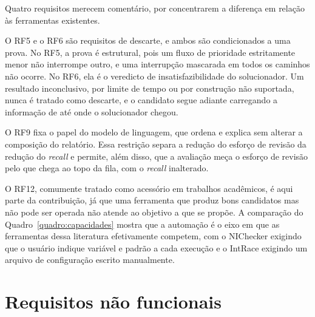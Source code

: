 Quatro requisitos merecem comentário, por concentrarem a diferença em relação às
ferramentas existentes.

O RF5 e o RF6 são requisitos de descarte, e ambos são condicionados a uma
prova. No RF5, a prova é estrutural, pois um fluxo de prioridade estritamente
menor não interrompe outro, e uma interrupção mascarada em todos os caminhos
não ocorre. No RF6, ela é o veredicto de insatisfazibilidade do
solucionador. Um resultado inconclusivo, por limite de tempo ou por construção
não suportada, nunca é tratado como descarte, e o candidato segue adiante
carregando a informação de até onde o solucionador chegou.

O RF9 fixa o papel do modelo de linguagem, que ordena e explica sem alterar a
composição do relatório. Essa restrição separa a redução do esforço de revisão
da redução do \textit{recall} e permite, além disso, que a avaliação meça o
esforço de revisão pelo que chega ao topo da fila, com o \textit{recall} inalterado.

O RF12, comumente tratado como acessório em trabalhos acadêmicos, é aqui parte
da contribuição, já que uma ferramenta que produz bons candidatos mas não pode
ser operada não atende ao objetivo a que se propõe. A comparação do
Quadro~\ref{quadro:capacidades} mostra que a automação é o eixo em que as
ferramentas dessa literatura efetivamente competem, com o NIChecker exigindo
que o usuário indique variável e padrão a cada execução e o IntRace exigindo
um arquivo de configuração escrito manualmente.

\section{Requisitos não funcionais}
\label{sec:rnf}

